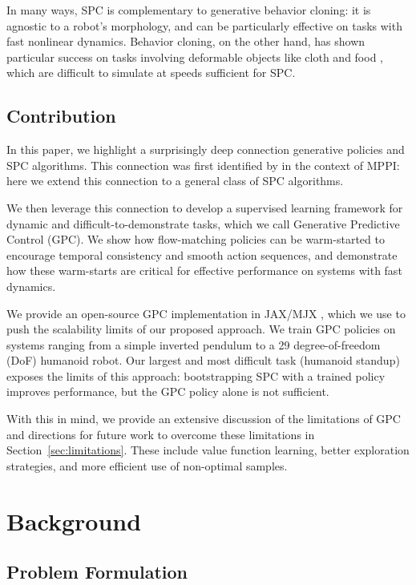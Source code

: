 \documentclass[letterpaper, 10 pt]{ieeeconf}
\begin{document}
In many ways, SPC is complementary to generative behavior cloning: it is agnostic to a robot's morphology, and can be particularly effective on tasks with fast nonlinear dynamics. Behavior cloning, on the other hand, has shown particular success on tasks involving deformable objects like cloth and food \cite{chi2023diffusion, black2024pi_0, zhao2023learning, fu2024mobile}, which are difficult to simulate at speeds sufficient for SPC. 

\subsection{Contribution}

In this paper, we highlight a surprisingly deep connection generative policies and SPC algorithms. This connection was first identified by \cite{pan2024model} in the context of MPPI: here we extend this connection to a general class of SPC algorithms. 

We then leverage this connection to develop a supervised learning framework for dynamic and difficult-to-demonstrate tasks, which we call Generative Predictive Control (GPC). We show how flow-matching policies can be warm-started to encourage temporal consistency and smooth action sequences, and demonstrate how these warm-starts are critical for effective performance on systems with fast dynamics.

We provide an open-source GPC implementation in JAX/MJX \cite{mjx}, which we use to push the scalability limits of our proposed approach. We train GPC policies on systems ranging from a simple inverted pendulum to a 29 degree-of-freedom (DoF) humanoid robot. Our largest and most difficult task (humanoid standup) exposes the limits of this approach: bootstrapping SPC with a trained policy improves performance, but the GPC policy alone is not sufficient.

With this in mind, we provide an extensive discussion of the limitations of GPC and directions for future work to overcome these limitations in Section~\ref{sec:limitations}. These include value function learning, better exploration strategies, and more efficient use of non-optimal samples. 

\section{Background}\label{sec:background}

\subsection{Problem Formulation}\label{sec:background:problem}
\end{document}
